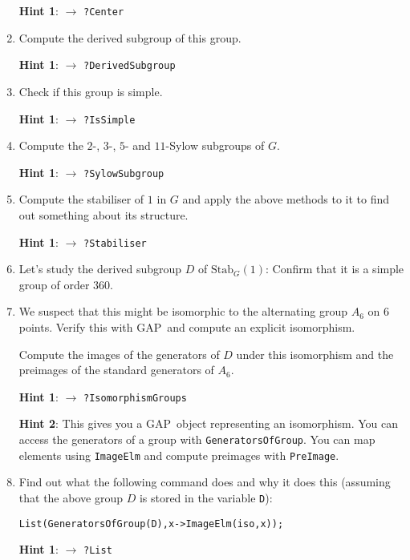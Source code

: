 \documentclass[12pt]{article}
\newcommand{\GAP}{\textsf{GAP}}
\newcommand{\Stab}{\mbox{Stab}}
\begin{document}
\begin{enumerate}
\smallskip
\textbf{Hint 1}: $\to$ \texttt{?Center}
\item Compute the derived subgroup of this group.

\smallskip
\textbf{Hint 1}: $\to$ \texttt{?DerivedSubgroup}
\item Check if this group is simple.

\smallskip
\textbf{Hint 1}: $\to$ \texttt{?IsSimple}
\item Compute the $2$-, $3$-, $5$- and $11$-Sylow subgroups of $G$.

\smallskip
\textbf{Hint 1}: $\to$ \texttt{?SylowSubgroup}
\item Compute the stabiliser of $1$ in $G$ and apply the above methods to
it to find out something about its structure.

\smallskip
\textbf{Hint 1}: $\to$ \texttt{?Stabiliser}
\item Let's study the derived subgroup $D$ of $\Stab_G(1)$: Confirm
that it is a simple group of order $360$.
\item We suspect that this might be isomorphic to the alternating group
$A_6$ on $6$ points. Verify this with \GAP\ and compute an explicit
isomorphism. 

Compute the images of the generators of $D$ under this
isomorphism and the preimages of the standard generators of $A_6$.

\smallskip
\textbf{Hint 1}: $\to$ \texttt{?IsomorphismGroups}

\smallskip
\textbf{Hint 2}: This gives you a \GAP\ object representing an isomorphism.
You can access the generators of a group with \texttt{GeneratorsOfGroup}.
You can map elements using \texttt{ImageElm} and compute preimages
with \texttt{PreImage}.

\item Find out what the following command does and why it does this
(assuming that the above group $D$ is stored in the variable \texttt{D}):

\centerline{\texttt{List(GeneratorsOfGroup(D),x->ImageElm(iso,x));}}

\smallskip
\textbf{Hint 1}: $\to$ \texttt{?List}


\end{enumerate}
\end{document}
